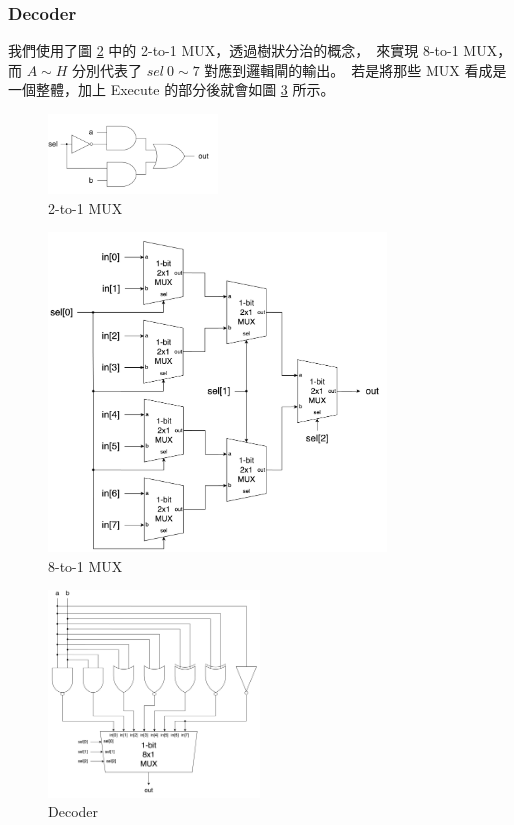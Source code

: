 \documentclass[10.5pt,compsoc,UTF8]{CjC}
\theoremstyle{mystyle}
\begin{document}
\subsubsection*{Decoder}

我們使用了圖 \ref{fig:2-to-1-MUX} 中的 2-to-1 MUX，透過樹狀分治的概念，\
來實現 8-to-1 MUX，而 $A \sim H$ 分別代表了 $sel\ 0 \sim 7$ 對應到邏輯閘的輸出。\
若是將那些 MUX 看成是一個整體，加上 Execute 的部分後就會如圖 \ref{fig:Q0-Decoder} 所示。



\begin{figure}[htp]
  \centering
  \includegraphics[width=0.4\textwidth]{2-to-1-MUX.png}
  \caption{2-to-1 MUX}
  \label{fig:2-to-1-MUX} 
\end{figure}

\begin{figure}[htp]
  \centering
  \includegraphics[width=0.8\textwidth]{MUXs.png}
  \caption{8-to-1 MUX}
  \label{fig:2-to-1-MUX} 
\end{figure}

\begin{figure}[htp]
  \centering
  \includegraphics[width=0.5\textwidth]{8-to-1-MUX.png}
  \caption{Decoder}
  \label{fig:Q0-Decoder}
\end{figure}
\end{document}
